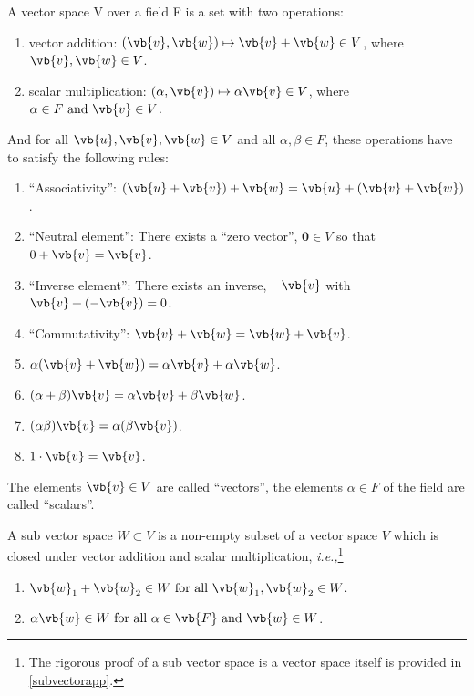 \documentclass[a4paper,12pt]{report}
\begin{document}
\begin{definition}
A vector space V over a field F is a set with two operations:

\begin{enumerate}
    \item vector addition: \((\vb{v}, \vb{w}) \mapsto \vb{v} + \vb{w} \in V \), where \(\vb{v} , \vb{w} \in V\).
    \item scalar multiplication: \((\alpha ,\vb{v}) \mapsto \alpha \vb{v} \in V\), where \(\alpha \in F \text { and } \vb{v} \in V\). 
\end{enumerate}

And for all \(\vb{u} ,\vb{v} ,\vb{w} \in V\) and all \(\alpha ,\beta \in F\), these operations have to satisfy the following rules:

\begin{enumerate}[label=(\(A\)\arabic*)]\label{vectorspace} 
    \item ``Associativity'': \((\vb{u} + \vb{v} ) + \vb{w}  = \vb{u}  + (\vb{v} + \vb{w} )\).
    \item ``Neutral element'': There exists a ``zero vector'', \(\boldsymbol{0} \in V\) so that \(0 + \vb{v} = \vb{v} \).
    \item ``Inverse element'': There exists an inverse, \(-\vb{v} \) with \(\vb{v} + (-\vb{v} ) = 0\).
    \item ``Commutativity'': \(\vb{v} + \vb{w} = \vb{w} + \vb{v} \).
    \item \(\alpha (\vb{v} +\vb{w} ) = \alpha \vb{v} + \alpha \vb{w} \).
    \item \((\alpha +\beta )\vb{v} = \alpha \vb{v} + \beta \vb{w} \).
    \item \((\alpha \beta )\vb{v} = \alpha (\beta \vb{v} )\).
    \item \(1\cdot \vb{v} = \vb{v} \).
\end{enumerate}

The elements \(\vb{v} \in V\) are called ``vectors'', the elements \(\alpha \in F\) of the field are called ``scalars''.  
\end{definition}

\begin{definition}\label{subvectorspace} 
A sub vector space \(W \subset V \) is a non-empty subset of a vector space \(V\) which is closed under vector addition and scalar multiplication, \textit{i.e.,}\footnote{The rigorous proof of a sub vector space is a vector space itself is provided in \cref{subvectorapp}.} 

\begin{enumerate}[label=(\(B\)\arabic*)]
    \item \(\vb{w} _{1} + \vb{w} _{2} \in W \text{ for all } \vb{w} _{1} , \vb{w} _{2} \in W\).
    \item \(\alpha \vb{w} \in W \text{ for all } \alpha \in \vb{F} \text { and } \vb{w} \in W\).     
\end{enumerate}
\end{definition}
\end{document}
